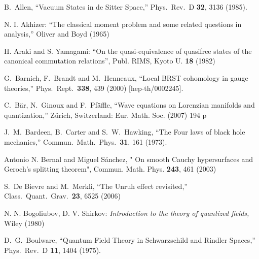 \documentclass[12pt]{article}
\theoremstyle{plain}
\theoremstyle{definition}
\begin{document}
\begin{thebibliography}{99}

 B.~Allen,
  ``Vacuum States in de Sitter Space,''
  Phys.\ Rev.\ D {\bf 32}, 3136 (1985).

N. I. Akhizer: ``The classical moment problem and some related questions in analysis,''
Oliver and Boyd (1965)

  

H. Araki and S. Yamagami: ``On the quasi-equivalence of quasifree states of the canonical commutation relations'',
Publ. RIMS, Kyoto U. {\bf 18} (1982)


  G.~Barnich, F.~Brandt and M.~Henneaux,
  ``Local BRST cohomology in gauge theories,''
  Phys.\ Rept.\  {\bf 338}, 439 (2000)
  [hep-th/0002245].


 C.~B\" ar, N.~Ginoux and F.~Pf\" affle,
  ``Wave equations on Lorenzian manifolds and quantization,''
  Z\" urich, Switzerland: Eur. Math. Soc. (2007) 194 p

J.~M.~Bardeen, B.~Carter and S.~W.~Hawking,
  ``The Four laws of black hole mechanics,''
  Commun.\ Math.\ Phys.\  {\bf 31}, 161 (1973).

Antonio N. Bernal and Miguel S\' anchez, " On smooth Cauchy hypersurfaces and Geroch's splitting theorem", Commun. Math. Phys.  {\bf 243}, 461 (2003)

 S.~De Bievre and M.~Merkli,
  ``The Unruh effect revisited,''
  Class.\ Quant.\ Grav.\  {\bf 23}, 6525 (2006)


N. N. Bogoliubov, D. V. Shirkov: {\em Introduction to the theory of quantized fields,}
Wiley (1980)

  D.~G.~Boulware,
  ``Quantum Field Theory in Schwarzschild and Rindler Spaces,''
  Phys.\ Rev.\ D {\bf 11}, 1404 (1975).


\end{thebibliography}
\end{document}
